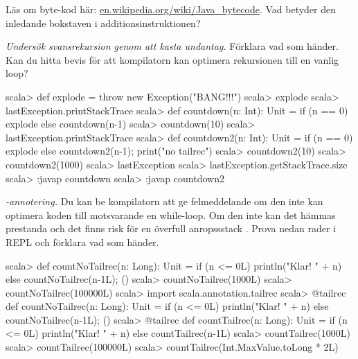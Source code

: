 \Subtask\Pen Läs om byte-kod här: \href{https://en.wikipedia.org/wiki/Java\_bytecode}{en.wikipedia.org/wiki/Java\_bytecode}. Vad betyder den inledande bokstaven i additionsinstruktionen?


\Task \emph{Undersök svansrekursion genom att kasta undantag.} Förklara vad som händer. Kan du hitta bevis för att kompilatorn kan optimera rekursionen till en vanlig loop?

\begin{REPL}
scala> def explode = throw new Exception("BANG!!!")
scala> explode
scala> lastException.printStackTrace
scala> def countdown(n: Int): Unit =
         if (n == 0) explode else countdown(n-1)
scala> countdown(10)
scala> lastException.printStackTrace
scala> def countdown2(n: Int): Unit =
         if (n == 0) explode else {countdown2(n-1); print("no tailrec")}
scala> countdown2(10)
scala> countdown2(1000)
scala> lastException
scala> lastException.getStackTrace.size
scala> :javap countdown
scala> :javap countdown2
\end{REPL}

\Task \emph{-annotering.} Du kan be kompilatorn att ge felmeddelande om den inte kan optimera koden till motsvarande en while-loop. Om den inte kan det hämmas prestanda och det finns risk för en överfull anropssstack . Prova nedan rader i REPL och förklara vad som händer.
\begin{REPL}
scala> def countNoTailrec(n: Long): Unit =
         if (n <= 0L) println("Klar! " + n) else {countNoTailrec(n-1L); ()}
scala> countNoTailrec(1000L)
scala> countNoTailrec(100000L)
scala> import scala.annotation.tailrec
scala> @tailrec def countNoTailrec(n: Long): Unit =
         if (n <= 0L) println("Klar! " + n) else {countNoTailrec(n-1L); ()}
scala> @tailrec def countTailrec(n: Long): Unit =
         if (n <= 0L) println("Klar! " + n) else countTailrec(n-1L)
scala> countTailrec(1000L)
scala> countTailrec(100000L)
scala> countTailrec(Int.MaxValue.toLong * 2L)
\end{REPL}
